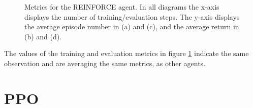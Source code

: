 \begin{figure}[H]
	\qquad
	\caption[REINFORCE Training]{Metrics for the REINFORCE agent. In all diagrams the x-axis displays the number of training/evaluation steps. The y-axis displays the average episode number in (a) and (c), and the average return in (b) and (d).}	
	\label{fig:reinforce_train}
\end{figure}


The values of the training and evaluation metrics in figure \ref{fig:reinforce_train} indicate the same observation and are averaging the same metrics, as other agents.




\section{PPO}

